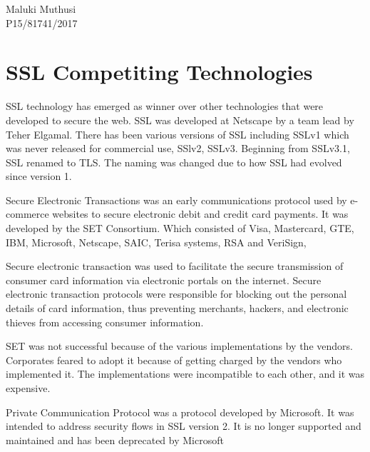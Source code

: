 \documentclass{article}
\begin{document}
\begin{flushleft}
    Maluki Muthusi \\
    P15/81741/2017
\end{flushleft}

\section*{SSL Competiting Technologies}

SSL technology has emerged as winner over other technologies that were developed to secure the web. SSL was developed at Netscape by a team lead by Teher Elgamal. There has been various versions of SSL including SSLv1 which was never released for commercial use, SSlv2, SSLv3. Beginning from SSLv3.1, SSL renamed to TLS. The naming was changed due to how SSL had evolved since version 1. \citep*{ellenmessmer}

Secure Electronic Transactions was an early communications protocol used by e-commerce websites to secure electronic debit and credit card payments. It was developed by the SET Consortium. Which consisted of Visa, Mastercard, GTE, IBM, Microsoft, Netscape, SAIC, Terisa systems, RSA and VeriSign, \citep*{williamstallings}

Secure electronic transaction was used to facilitate the secure transmission of consumer card information via electronic portals on the internet. Secure electronic transaction protocols were responsible for blocking out the personal details of card information, thus preventing merchants, hackers, and electronic thieves from accessing consumer information.

SET was not successful because of the various implementations by the vendors. Corporates feared to adopt it because of getting charged by the vendors who implemented it. The implementations were incompatible to each other, and it was expensive.

Private Communication Protocol was a protocol developed by Microsoft. It was intended to address security flows in SSL version 2. It is no longer supported and maintained and has been deprecated by Microsoft

\nocite{*}


\end{document}
